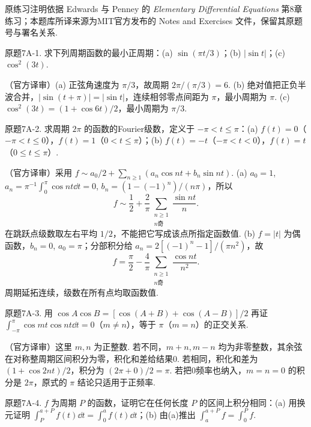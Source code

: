 原练习注明依据 Edwards 与 Penney 的 \textit{Elementary Differential Equations} 第8章练习；本题库所译来源为MIT官方发布的 Notes and Exercises 文件，保留其原题号与署名关系.
\begin{exercise}\label{cw:bank-7A-1}原题7A-1. 求下列周期函数的最小正周期：(a) $\sin(\pi t/3)$；(b) $|\sin t|$；(c) $\cos^2(3t)$.\end{exercise}
\begin{solution}（官方译审）(a) 正弦角速度为 $\pi/3$，故周期 $2\pi/(\pi/3)=6$. (b) 绝对值把正负半波合并，$|\sin(t+\pi)|=|\sin t|$，连续相邻零点间距为 $\pi$，最小周期为 $\pi$. (c) $\cos^2(3t)=(1+\cos6t)/2$，最小周期为 $\pi/3$.\end{solution}
\begin{exercise}\label{cw:bank-7A-2}原题7A-2. 求周期 $2\pi$ 的函数的Fourier级数，定义于 $-\pi<t\le\pi$：(a) $f(t)=0$（$-\pi<t\le0$），$f(t)=1$（$0<t\le\pi$）；(b) $f(t)=-t$（$-\pi<t<0$），$f(t)=t$（$0\le t\le\pi$）.\end{exercise}
\begin{solution}（官方译审）采用 $f\sim a_0/2+\sum_{n\ge1}(a_n\cos nt+b_n\sin nt)$. (a) $a_0=1$, $a_n=\pi^{-1}\int_0^\pi\cos nt\dd t=0$, $b_n=(1-(-1)^n)/(n\pi)$，所以
\[f\sim\frac12+\frac2\pi\sum_{\substack{n\ge1\\n\text{奇}}}\frac{\sin nt}{n}.\]
在跳跃点级数取左右平均 $1/2$，不能把它写成该点所指定函数值. (b) $f=|t|$ 为偶函数，$b_n=0$, $a_0=\pi$；分部积分给 $a_n=2[(-1)^n-1]/(\pi n^2)$，故
\[f=\frac\pi2-\frac4\pi\sum_{\substack{n\ge1\\n\text{奇}}}\frac{\cos nt}{n^2}.\]
周期延拓连续，级数在所有点均取函数值.\end{solution}
\begin{exercise}\label{cw:bank-7A-3}原题7A-3. 用 $\cos A\cos B=[\cos(A+B)+\cos(A-B)]/2$ 再证 $\int_{-\pi}^{\pi}\cos mt\cos nt\dd t=0$（$m\ne n$），等于 $\pi$（$m=n$）的正交关系.\end{exercise}
\begin{solution}（官方译审）这里 $m,n$ 为正整数. 若不同，$m+n,m-n$ 均为非零整数，其余弦在对称整周期区间积分为零，积化和差给结果0. 若相同，积化和差为 $(1+\cos2nt)/2$，积分为 $(2\pi+0)/2=\pi$. 若把0频率也纳入，$m=n=0$ 的积分是 $2\pi$，原式的 $\pi$ 结论只适用于正频率.\end{solution}
\begin{exercise}\label{cw:bank-7A-4}原题7A-4. $f$ 为周期 $P$ 的函数，证明它在任何长度 $P$ 的区间上积分相同：(a) 用换元证明 $\int_P^{a+P}f(t)\dd t=\int_0^af(t)\dd t$；(b) 由(a)推出 $\int_a^{a+P}f=\int_0^Pf$.\end{exercise}
